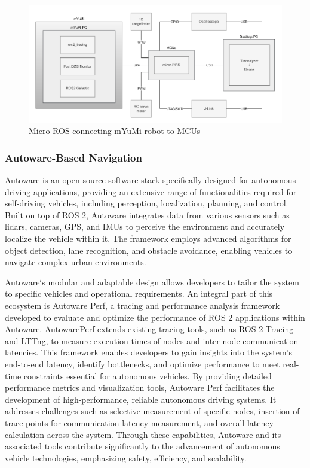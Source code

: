 \vspace{0.7em}
\begin{figure}[H]
    \centering
    \includegraphics[width=6.4in ]{pics/microROS.png}
    \caption[Micro-ROS connecting mYuMi robot to MCUs]{Micro-ROS connecting mYuMi robot to MCUs~\cite{nguyen2022microros}}\label{microros}
\end{figure}



\subsubsection{Autoware-Based Navigation}
Autoware is an open-source software stack specifically designed for autonomous driving applications, providing an extensive
range of functionalities required for self-driving vehicles, including perception, localization, planning, and control. 
Built on top of ROS 2, Autoware integrates data from various sensors such as lidars, cameras, GPS, and IMUs to perceive the 
environment and accurately localize the vehicle within it. The framework employs advanced algorithms for object detection, 
lane recognition, and obstacle avoidance, enabling vehicles to navigate complex urban environments.

\noindent Autoware`s modular and adaptable design allows developers to tailor the system to specific vehicles and 
operational
requirements. An integral part of this ecosystem is Autoware
Perf, a tracing and performance analysis framework developed to evaluate and optimize the performance of ROS 2 applications
within Autoware. AutowarePerf extends existing tracing tools, such as ROS 2 Tracing and LTTng, to measure execution times 
of nodes and inter-node communication latencies. This framework enables developers to gain insights into the system's 
end-to-end latency, identify bottlenecks, and optimize performance to meet real-time constraints essential for autonomous vehicles.
By providing detailed performance metrics and visualization tools, Autoware Perf facilitates the development of 
high-performance, reliable autonomous driving systems. It addresses challenges such as selective measurement of specific nodes, 
insertion of trace points for communication latency measurement, and overall latency calculation across the system. 
Through these capabilities, Autoware and its associated tools contribute significantly to the advancement of autonomous vehicle 
technologies, emphasizing safety, efficiency, and scalability.\\

